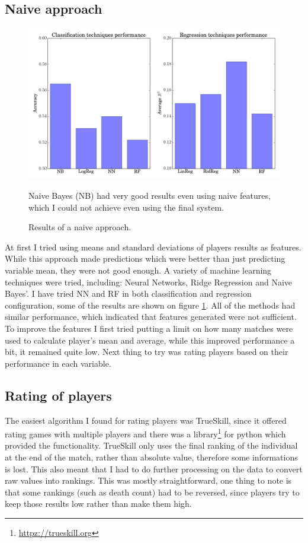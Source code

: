 \documentclass[12pt,a4paper]{book}
\newcommand\note[1]{\vspace*{-0.5\baselineskip}\caption*{#1}}
\begin{document}
\subsection{Naive approach}
\begin{figure}[ht]
\centering
\includegraphics[scale=0.5]{simple-results}
\caption{Results of a naive approach.}
\note{Naive Bayes (NB) had very good results even using naive features, which I could not achieve even using the final system.}
\label{fig:simple-results}
\end{figure}

At first I tried using means and standard deviations of players results as features.
While this approach made predictions which were better than just predicting variable mean, they were not good enough.
A variety of machine learning techniques were tried, including: Neural Networks, Ridge Regression and Naive Bayes'.
I have tried NN and RF in both classification and regression configuration, some of the results are shown on figure \ref{fig:simple-results}.
All of the methods had similar performance, which indicated that features generated were not sufficient.
To improve the features I first tried putting a limit on how many matches were used to calculate player's mean and average, while this improved performance a bit, it remained quite low.
Next thing to try was rating players based on their performance in each variable.

\subsection{Rating of players}
The easiest algorithm I found for rating players was TrueSkill, since it offered rating games with multiple players and there was a library\footnote{\url{httpz://trueskill.org}} for python which provided the functionality.
TrueSkill only uses the final ranking of the individual at the end of the match, rather than absolute value, therefore some informations is lost.
This also meant that I had to do further processing on the data to convert raw values into rankings.
This was mostly straightforward, one thing to note is that some rankings (such as death count) had to be reversed, since players try to keep those results low rather than make them high.
\end{document}
